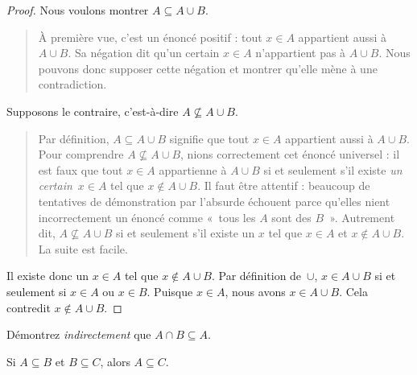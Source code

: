 \documentclass[../../../include/open-logic-section]{subfiles}
\begin{document}
\begin{proof}
  Nous voulons montrer
  $A \subseteq A \cup B$.
  \begin{quote}
    À première vue, c'est un
    énoncé positif : tout
    $x \in A$ appartient aussi
    à $A \cup B$. Sa négation
    dit qu'un certain $x \in A$
    n'appartient pas à $A \cup B$.
    Nous pouvons donc supposer
    cette négation et montrer
    qu'elle mène à une contradiction.
  \end{quote}
  Supposons le contraire,
  c'est-à-dire
  $A \nsubseteq A \cup B$.
  \begin{quote}
    Par définition,
    $A \subseteq A \cup B$
    signifie que tout $x \in A$
    appartient aussi à $A \cup B$.
    Pour comprendre
    $A \nsubseteq A \cup B$,
    nions correctement cet
    énoncé universel :
    il est faux que tout
    $x \in A$ appartienne
    à $A \cup B$ si et
    seulement s'il existe
    \emph{un certain}~$x \in A$
    tel que $x \notin A \cup B$.
    Il faut être attentif :
    beaucoup de tentatives de
    démonstration par l'absurde
    échouent parce qu'elles
    nient incorrectement un
    énoncé comme «~tous les
    $A$ sont des $B$~».
    Autrement dit,
    $A \nsubseteq A \cup B$
    si et seulement s'il
    existe un $x$ tel que
    $x \in A$ et
    $x \notin A \cup B$.
    La suite est facile.
  \end{quote}
  Il existe donc un $x \in A$
  tel que $x \notin A \cup B$.
  Par définition de~$\cup$,
  $x \in A \cup B$ si et
  seulement si $x \in A$
  ou $x \in B$. Puisque
  $x \in A$, nous avons
  $x \in A \cup B$.
  Cela contredit
  $x \notin A \cup B$.
\end{proof}

\begin{prob}
Démontrez \emph{indirectement}
que $A \cap B \subseteq A$.
\end{prob}

\begin{prop}
Si $A \subseteq B$ et
$B \subseteq C$, alors
$A \subseteq C$.
\end{prop}
\end{document}
